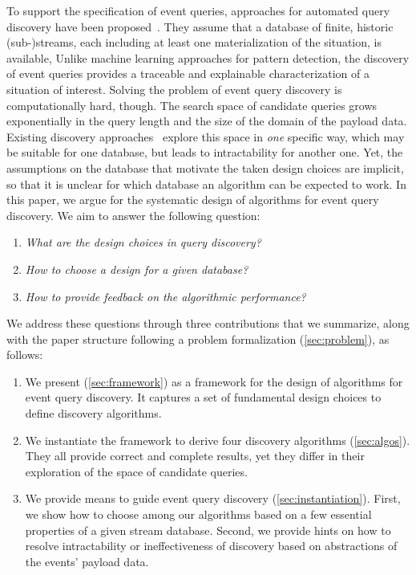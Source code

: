 To support the specification of event queries, approaches for automated query
discovery have been proposed~\cite{icep,ilminer}. They assume that a database
of finite, historic (sub-)streams, each including at least one
materialization of
the situation, is available, 
Unlike machine learning approaches for pattern detection, the discovery of
event queries provides a traceable and
explainable characterization of a situation of interest.
Solving the problem of event query discovery is computationally hard, though.
The search space of candidate queries grows exponentially in
the query length and the size of the domain of the payload data. Existing
discovery approaches~\cite{icep,ilminer} explore this
space in \emph{one} specific way, which may be suitable for one
database, but leads to intractability for another one. Yet, the assumptions on
the database that motivate the taken design choices are implicit, so that it is
unclear for which database an algorithm can be expected to work.
In this paper, we argue for the systematic design of algorithms for
event query discovery. We aim to answer the following question:
\begin{enumerate}[label=(\roman*),left=0pt,nosep]
\item \emph{What are the design choices in query discovery?}
\item \emph{How to choose a design for a given database?}
\item \emph{How to provide feedback on the algorithmic performance?}
\end{enumerate}
We address these questions through three contributions that we summarize,
along
with the paper structure following a problem formalization
(\autoref{sec:problem}), as follows:
\begin{enumerate}[left=0pt,nosep]
\item We present \sys{} (\autoref{sec:framework})
as a framework
for the design of algorithms for event query
discovery. It captures a set of fundamental design
choices to define discovery algorithms.
\item We instantiate the framework to derive four
discovery algorithms
(\autoref{sec:algos}). They all provide correct
and complete results, yet they differ in their exploration of the space of
candidate queries.
\item We provide means to guide event query discovery
(\autoref{sec:instantiation}). First, we show how to choose among our
algorithms based on a few essential properties of a given stream database.
Second, we provide hints on how to resolve intractability or ineffectiveness of
discovery based on abstractions of the events' payload data.
\end{enumerate}
